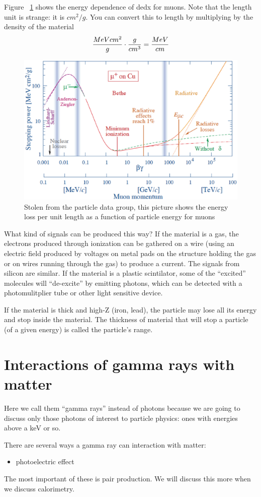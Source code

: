 Figure ~\ref{fig:pdgdedx} shows the energy dependence of dedx for muons.  Note that the length unit is strange: it is $cm^2/g$.  You can convert this to length by multiplying by the density of the material
\begin{equation}
{{MeV cm^2}\over{g}} \cdot {{g}\over{cm^3}} = {{MeV}\over{cm}}
\end{equation}

\begin{figure}[h]
\centering\includegraphics[scale=0.5]{./particleinteractions/Pictures/dedx.eps}
\caption{Stolen from the particle data group, this picture shows the energy
loss per unit length as a function of particle energy for muons}
\label{fig:pdgdedx}
\end{figure}

What kind of signals can be produced this way?  If the material is a gas, the electrons produced through ionization can be gathered on a wire (using an electric field produced by voltages on metal pads on the structure holding the gas or on wires running through the gas) to produce a current.  The signals from silicon are similar.  If the material is a plastic scintilator, some of the ``excited'' molecules will ``de-excite'' by emitting photons, which can be detected with a photomulitplier tube or other light sensitive device.

If the material is thick and high-Z (iron, lead), the particle may lose all its energy and 
stop inside the material.  The thickness of material that will stop a particle (of a given energy) is called the particle's range.


\section{Interactions of gamma rays with matter}

Here we call them “gamma rays” instead of photons because we are going to discuss only those photons of interest to particle physics: ones with energies above a keV or so.

There are several ways a gamma ray can interaction with matter:
\begin{itemize}
\item photoelectric effect
\end{itemize}

The most important of these is pair production.  We will discuss this more when we discuss calorimetry.

